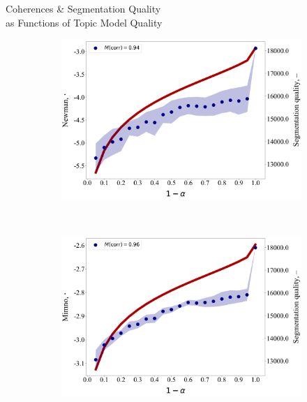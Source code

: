 \documentclass[russian]{beamer}
\begin{document}
\begin{frame}{Coherences \& Segmentation Quality\\as Functions of Topic Model Quality}
  
  \begin{figure}[h]
    \begin{subfigure}[t]{0.48\textwidth}
      \includegraphics[width=\linewidth]{newman-iteration.jpg}
    \end{subfigure}
    ~
    \begin{subfigure}[t]{0.48\textwidth}
      \includegraphics[width=\linewidth]{mimno-iteration.jpg}
    \end{subfigure}
    \begin{subfigure}[t]{0.48\textwidth}

\end{subfigure}
\end{figure}
\end{frame}
\end{document}
